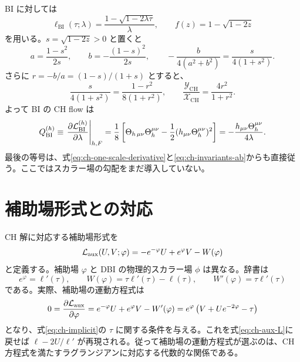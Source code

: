 BI に対しては
\begin{equation}
 \ell_{\mathrm{BI}}(\tau;\lambda)
 =\frac{1-\sqrt{1-2\lambda\tau}}{\lambda},
 \qquad f(z)=1-\sqrt{1-2z}
 \label{eq:ch-ell-bi}
\end{equation}
を用いる。$s=\sqrt{1-2z}>0$ と置くと
\begin{equation}
 a=\frac{1-s^2}{2s},\qquad
 b=-\frac{(1-s)^2}{2s},\qquad
 -\frac{b}{4(a^2+b^2)}=\frac{s}{4(1+s^2)}.
 \label{eq:ch-ab-bi}
\end{equation}
さらに $r=-b/a=(1-s)/(1+s)$ とすると、
\begin{equation}
 \frac{s}{4(1+s^2)}
 =\frac{1-r^2}{8(1+r^2)},\qquad
 \frac{\mathcal Y_{\mathrm{CH}}}{\mathcal X_{\mathrm{CH}}}
 =\frac{4r^2}{1+r^2}.
 \label{eq:ch-r-bi}
\end{equation}
よって BI の CH flow は
\begin{equation}
 Q_{\mathrm{BI}}^{(h)}
 \equiv\left.\frac{\partial\mathcal L_{\mathrm{BI}}^{(h)}}{\partial\lambda}\right|_{h,F}
 =\frac18\left[\Theta_{h\,\mu\nu}\Theta_h^{\mu\nu}
 -\frac12(h_{\mu\nu}\Theta_h^{\mu\nu})^2\right]
 =-\frac{h_{\mu\nu}\Theta_h^{\mu\nu}}{4\lambda}.
 \label{eq:ch-bi-flow}
\end{equation}
最後の等号は、式\eqref{eq:ch-one-scale-derivative}と\eqref{eq:ch-invariants-ab}からも直接従う。ここではスカラー場の勾配をまだ導入していない。

\section{補助場形式との対応}

CH 解に対応する補助場形式\cite{Pezhman2026}を
\begin{equation}
 \mathcal L_{\mathrm{aux}}(U,V;\varphi)
 =-e^{-\varphi}U+e^\varphi V-W(\varphi)
 \label{eq:ch-aux-L}
\end{equation}
と定義する。補助場 $\varphi$ と DBI の物理的スカラー場 $\phi$ は異なる。辞書は
\begin{equation}
 e^\varphi=\ell'(\tau),\qquad
 W(\varphi)=\tau\ell'(\tau)-\ell(\tau),\qquad
 W'(\varphi)=\tau\ell'(\tau)
 \label{eq:ch-aux-dictionary}
\end{equation}
である。実際、補助場の運動方程式は
\begin{equation}
 0=\frac{\partial\mathcal L_{\mathrm{aux}}}{\partial\varphi}
 =e^{-\varphi}U+e^\varphi V-W'(\varphi)
 =e^\varphi\left(V+Ue^{-2\varphi}-\tau\right)
 \label{eq:ch-aux-eom}
\end{equation}
となり、式\eqref{eq:ch-implicit}の $\tau$ に関する条件を与える。これを式\eqref{eq:ch-aux-L}に戻せば $\ell-2U/\ell'$ が再現される。従って補助場の運動方程式が選ぶのは、CH 方程式を満たすラグランジアンに対応する代数的な関係である。


